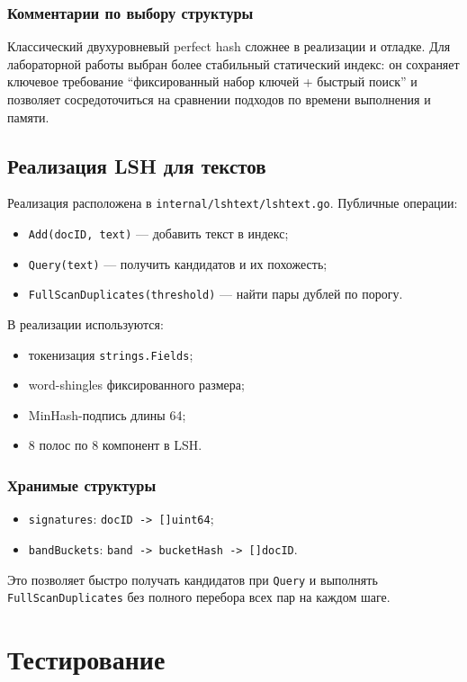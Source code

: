 \documentclass{itmo}
\begin{document}
\subsection*{Комментарии по выбору структуры}
Классический двухуровневый perfect hash сложнее в реализации и отладке.
Для лабораторной работы выбран более стабильный статический индекс:
он сохраняет ключевое требование ``фиксированный набор ключей + быстрый поиск''
и позволяет сосредоточиться на сравнении подходов по времени выполнения и памяти.

\section{Реализация LSH для текстов}

Реализация расположена в \texttt{internal/lshtext/lshtext.go}.
Публичные операции:
\begin{itemize}
	\item \texttt{Add(docID, text)} --- добавить текст в индекс;
	\item \texttt{Query(text)} --- получить кандидатов и их похожесть;
	\item \texttt{FullScanDuplicates(threshold)} --- найти пары дублей по порогу.
\end{itemize}

В реализации используются:
\begin{itemize}
	\item токенизация \texttt{strings.Fields};
	\item word-shingles фиксированного размера;
	\item MinHash-подпись длины 64;
	\item 8 полос по 8 компонент в LSH.
\end{itemize}

\subsection*{Хранимые структуры}
\begin{itemize}
	\item \texttt{signatures}: \texttt{docID -> []uint64};
	\item \texttt{bandBuckets}: \texttt{band -> bucketHash -> []docID}.
\end{itemize}
Это позволяет быстро получать кандидатов при \texttt{Query}
и выполнять \texttt{FullScanDuplicates} без полного перебора всех пар на каждом шаге.

\chapter{Тестирование}
\end{document}
